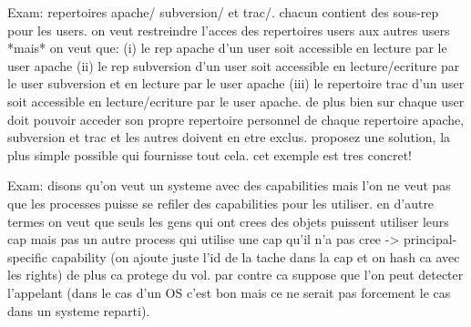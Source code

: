 Exam: repertoires apache/ subversion/ et trac/. chacun contient des sous-rep
  pour les users. on veut restreindre l'acces des repertoires users aux autres
  users *mais* on veut que: (i) le rep apache d'un user soit accessible
  en lecture par le user apache (ii) le rep subversion d'un user soit
  accessible en lecture/ecriture par le user subversion et en lecture par
  le user apache (iii) le repertoire trac d'un user soit accessible en
  lecture/ecriture par le user apache.
  de plus bien sur chaque user doit pouvoir acceder son propre repertoire
  personnel de chaque repertoire apache, subversion et trac et les autres
  doivent en etre exclus.
  proposez une solution, la plus simple possible qui fournisse tout cela.
  cet exemple est tres concret!

Exam: disons qu'on veut un systeme avec des capabilities mais l'on ne veut
  pas que les processes puisse se refiler des capabilities pour les utiliser.
  en d'autre termes on veut que seuls les gens qui ont crees des objets
  puissent utiliser leurs cap mais pas un autre process qui utilise une cap
  qu'il n'a pas cree -> principal-specific capability (on ajoute juste l'id
  de la tache dans la cap et on hash ca avec les rights)
  de plus ca protege du vol. par contre ca suppose que l'on peut detecter
  l'appelant (dans le cas d'un OS c'est bon mais ce ne serait pas forcement
  le cas dans un systeme reparti).
